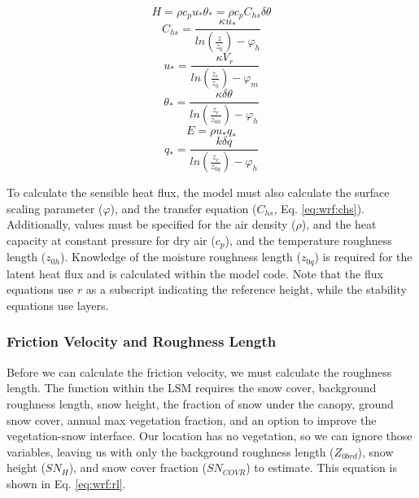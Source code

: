 {\begin{equation}\label{eq:wrf:h}
H = \rho c_{p} u_{*} \theta_{*} = \rho c_{p} C_{hs} \delta \theta
\end{equation}
\begin{equation}\label{eq:wrf:chs}
C_{hs} = \frac{\kappa u_{*}}{ln (\frac{z}{z_{0}}) - \varphi_{h}}
\end{equation}
\begin{equation}\label{eq:wrf:ustar}
u_{*} = \frac{\kappa V_{r}}{ln(\frac{z_{r}}{z_{0}}) - \varphi_{m}}
\end{equation}
\begin{equation}\label{eq:wrf:thetastar}
\theta_{*} = \frac{\kappa \delta \theta}{ln(\frac{z_{r}}{z_{0h}}) - \varphi_{h}} 
\end{equation}
\begin{equation}\label{eq:wrf:e}
E = \rho u_{*} q_{*}
\end{equation}
\begin{equation}\label{eq:wrf:q*}
q_{*} = \frac{k \delta q}{ln(\frac{z_{r}}{z_{0q}}) - \varphi_{h}}
\end{equation}

To calculate the sensible heat flux, the model must also calculate the surface scaling parameter ($\varphi$), and the transfer equation ($C_{hs}$, Eq. \ref{eq:wrf:chs}). Additionally, values must be specified for the air density ($\rho$), and the heat capacity at constant pressure for dry air ($c_{p}$), and the temperature roughness length ($z_{0h}$). Knowledge of the moisture roughness length ($z_{0q}$) is required for the latent heat flux and is calculated within the model code. Note that the flux equations use $r$ as a subscript indicating the reference height, while the stability equations use layers.

\subsubsection{Friction Velocity and Roughness Length}
Before we can calculate the friction velocity, we must calculate the roughness length. The function within the LSM requires the snow cover, background roughness length, snow height, the fraction of snow under the canopy, ground snow cover, annual max vegetation fraction, and an option to improve the vegetation-snow interface. Our location has no vegetation, so we can ignore those variables, leaving us with only the background roughness length ($Z_{0brd}$), snow height ($SN_{H}$), and snow cover fraction ($SN_{COVR}$) to estimate. This equation is shown in Eq. \ref{eq:wrf:rl}.

}
